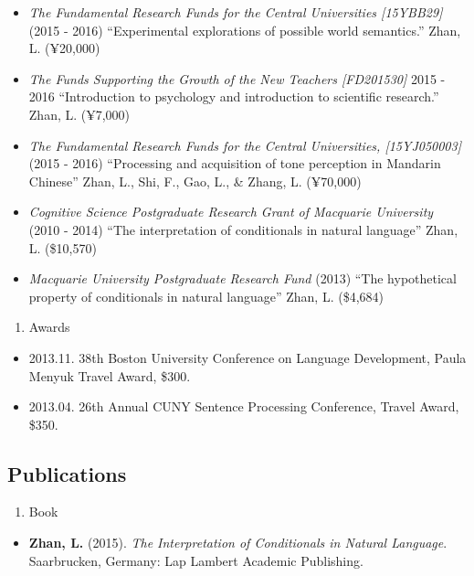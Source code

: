 \documentclass[10pt,]{article}
\providecommand{\tightlist}{%
  \setlength{\itemsep}{0pt}\setlength{\parskip}{0pt}}
\begin{document}
\begin{itemize}
\item
  \emph{The Fundamental Research Funds for the Central Universities
  {[}15YBB29{]}} (2015 - 2016) ``Experimental explorations of possible
  world semantics.'' Zhan, L. (¥20,000)
\item
  \emph{The Funds Supporting the Growth of the New Teachers
  {[}FD201530{]}} 2015 - 2016 ``Introduction to psychology and
  introduction to scientific research.'' Zhan, L. (¥7,000)
\item
  \emph{The Fundamental Research Funds for the Central Universities,
  {[}15YJ050003{]}} (2015 - 2016) ``Processing and acquisition of tone
  perception in Mandarin Chinese'' Zhan, L., Shi, F., Gao, L., \& Zhang,
  L. (¥70,000)
\item
  \emph{Cognitive Science Postgraduate Research Grant of Macquarie
  University} (2010 - 2014) ``The interpretation of conditionals in
  natural language'' Zhan, L. (\$10,570)
\item
  \emph{Macquarie University Postgraduate Research Fund} (2013) ``The
  hypothetical property of conditionals in natural language'' Zhan, L.
  (\$4,684)
\end{itemize}

\begin{enumerate}
\def\labelenumi{\arabic{enumi}.}
\setcounter{enumi}{1}
\tightlist
\item
  Awards
\end{enumerate}

\begin{itemize}
\item
  2013.11. 38th Boston University Conference on Language Development,
  Paula Menyuk Travel Award, \$300.
\item
  2013.04. 26th Annual CUNY Sentence Processing Conference, Travel
  Award, \$350.
\end{itemize}

\hypertarget{publications}{%
\subsection{Publications}\label{publications}}

\begin{enumerate}
\def\labelenumi{\arabic{enumi}.}
\tightlist
\item
  Book
\end{enumerate}

\begin{itemize}
\tightlist
\item
  \textbf{Zhan, L.} (2015). \emph{The Interpretation of Conditionals in
  Natural Language}. Saarbrucken, Germany: Lap Lambert Academic
  Publishing.
\end{itemize}
\end{document}
